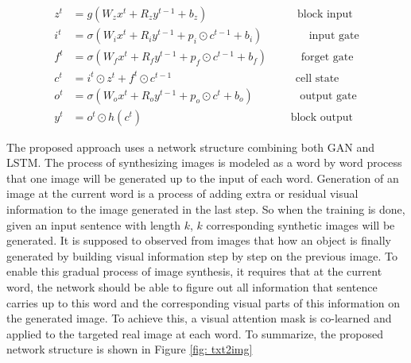 \documentclass{iitthesis}
\begin{document}
\begin{align*}
z^t &= g(W_z x^t + R_z y^{t-1} + b_z) \;\;\;\;\;\;\;\;\;\;\;\;\;\;\;\;\;\;\;\;\;\;\;\;\;\;\;\;\;  \text{block input}\\
i^t &= \sigma(W_i x^t + R_i y^{t-1} + p_i \odot c^{t-1} + b_i) \;\;\;\;\;\;\;\;\;\;\;\;\;\;\;  \text{input gate}\\
f^t &= \sigma(W_f x^t + R_f y^{t-1} + p_f\odot c^{t-1} + b_f)\;\;\;\;\;\;\;\;\;\;\;  \text{forget gate}\\
c^t &= i^t \odot z^t + f^t \odot c^{t-1} \;\;\;\;\;\;\;\;\;\;\;\;\;\;\;\;\;\;\;\;\;\;\;\;\;\;\;\;\;\;\;\;\;\;\;\;\;\;\;\;  \text{cell state}\\
o^t &= \sigma(W_o x^t + R_o y^{t-1} + p_o \odot c^t + b_o) \;\;\;\;\;\;\;\;\;\;\;\;\;\;\;  \text{output gate}\\
y^t &= o^t \odot h(c^t) \;\;\;\;\;\;\;\;\;\;\;\;\;\;\;\;\;\;\;\;\;\;\;\;\;\;\;\;\;\;\;\;\;\;\;\;\;\;\;\;\;\;\;\;\;\;\;\;　\text{block output}
\end{align*}

 The proposed approach uses a network structure combining both GAN and LSTM. The process of synthesizing images is modeled as a word by word process that one image will be generated up to the input of each word. Generation of an image at the current word is a process of adding extra or residual visual information to the image generated in the last step. So when the training is done, given an input sentence with length $k$, $k$ corresponding synthetic images will be generated. It is supposed to observed from images that how an object is finally generated by building visual information step by step on the previous image. To enable this gradual process of image synthesis, it requires that at the current word, the network should be able to figure out all information that sentence carries up to this word and the corresponding visual parts of this information on the generated image. To achieve this, a visual attention mask is co-learned and applied to the targeted real image at each word. To summarize, the proposed network structure is shown in Figure \ref{fig: txt2img}
\end{document}
